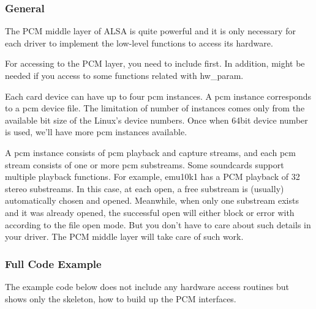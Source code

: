 \documentclass[a4paper,8pt,english]{sphinxmanual}
\begin{document}
\subsubsection{General}
\label{sound/kernel-api/writing-an-alsa-driver:id2}
The PCM middle layer of ALSA is quite powerful and it is only necessary
for each driver to implement the low-level functions to access its
hardware.

For accessing to the PCM layer, you need to include 
first. In addition,  might be needed if you
access to some functions related with hw\_param.

Each card device can have up to four pcm instances. A pcm instance
corresponds to a pcm device file. The limitation of number of instances
comes only from the available bit size of the Linux's device numbers.
Once when 64bit device number is used, we'll have more pcm instances
available.

A pcm instance consists of pcm playback and capture streams, and each
pcm stream consists of one or more pcm substreams. Some soundcards
support multiple playback functions. For example, emu10k1 has a PCM
playback of 32 stereo substreams. In this case, at each open, a free
substream is (usually) automatically chosen and opened. Meanwhile, when
only one substream exists and it was already opened, the successful open
will either block or error with  according to the file open
mode. But you don't have to care about such details in your driver. The
PCM middle layer will take care of such work.


\subsubsection{Full Code Example}
\label{sound/kernel-api/writing-an-alsa-driver:id3}
The example code below does not include any hardware access routines but
shows only the skeleton, how to build up the PCM interfaces.
\end{document}
